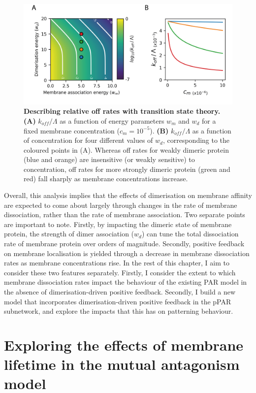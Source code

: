\documentclass[12pt]{"report"}
\newcommand{\mycaption}[2]{\caption[#1]{\textbf{#1.} #2}}
\begin{document}
\begin{figure}
\includegraphics[scale=1]{thermodynamic_model_koff}
\centering
\mycaption{Describing relative off rates with transition state theory}{
\textbf{(A)} $k_{off} / \Lambda$ as a function of energy parameters $w_m$ and $w_d$ for a fixed membrane concentration ($c_m = 10^{-5}$).
\textbf{(B)} $k_{off} / \Lambda$ as a function of concentration for four different values of $w_d$, corresponding to the coloured points in (A). Whereas off rates for weakly dimeric protein (blue and orange) are insensitive (or weakly sensitive) to concentration, off rates for more strongly dimeric protein (green and red) fall sharply as membrane concentrations increase.
}
\label{fig:thermodynamic_model_koff}
\end{figure}

Overall, this analysis implies that the effects of dimerisation on membrane affinity are expected to come about largely through changes in the rate of membrane dissociation, rather than the rate of membrane association. Two separate points are important to note. Firstly, by impacting the dimeric state of membrane protein, the strength of dimer association ($w_d$) can tune the total dissociation rate of membrane protein over orders of magnitude. Secondly, positive feedback on membrane localisation is yielded through a decrease in membrane dissociation rates as membrane concentrations rise. In the rest of this chapter, I aim to consider these two features separately. Firstly, I consider the extent to which membrane dissociation rates impact the behaviour of the existing PAR model in the absence of dimerisation-driven positive feedback. Secondly, I build a new model that incorporates dimerisation-driven positive feedback in the pPAR subnetwork, and explore the impacts that this has on patterning behaviour.\\


\clearpage
\section{Exploring the effects of membrane lifetime in the mutual antagonism model}
\label{section:goehring_model_off_rates}
\end{document}
